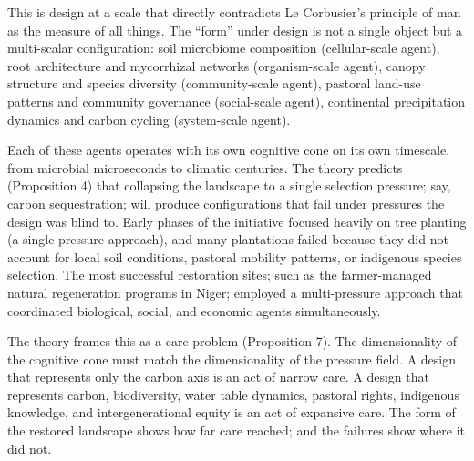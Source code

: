 This is design at a scale that directly contradicts Le Corbusier's principle of man as the measure of all things. The ``form'' under design is not a single object but a multi-scalar configuration: soil microbiome composition (cellular-scale agent), root architecture and mycorrhizal networks (organism-scale agent), canopy structure and species diversity (community-scale agent), pastoral land-use patterns and community governance (social-scale agent), continental precipitation dynamics and carbon cycling (system-scale agent).

Each of these agents operates with its own cognitive cone on its own timescale, from microbial microseconds to climatic centuries. The theory predicts (Proposition 4) that collapsing the landscape to a single selection pressure; say, carbon sequestration; will produce configurations that fail under pressures the design was blind to. Early phases of the initiative focused heavily on tree planting (a single-pressure approach), and many plantations failed because they did not account for local soil conditions, pastoral mobility patterns, or indigenous species selection. The most successful restoration sites; such as the farmer-managed natural regeneration programs in Niger; employed a multi-pressure approach that coordinated biological, social, and economic agents simultaneously.

The theory frames this as a care problem (Proposition 7). The dimensionality of the cognitive cone must match the dimensionality of the pressure field. A design that represents only the carbon axis is an act of narrow care. A design that represents carbon, biodiversity, water table dynamics, pastoral rights, indigenous knowledge, and intergenerational equity is an act of expansive care. The form of the restored landscape shows how far care reached; and the failures show where it did not.
